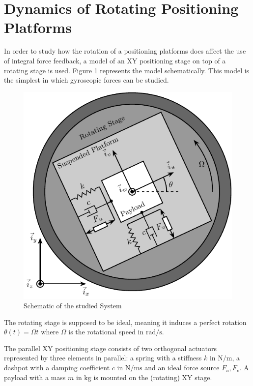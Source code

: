 \documentclass{ISMA_USD2020}
\begin{document}
\section{Dynamics of Rotating Positioning Platforms}
\label{sec:org967f3ca}
\label{sec:dynamics}
In order to study how the rotation of a positioning platforms does affect the use of integral force feedback, a model of an XY positioning stage on top of a rotating stage is used.
Figure \ref{fig:system} represents the model schematically.
This model is the simplest in which gyroscopic forces can be studied.

\begin{figure}[htbp]
\centering
\includegraphics[scale=1]{figs/system.pdf}
\caption{\label{fig:system}Schematic of the studied System}
\end{figure}

The rotating stage is supposed to be ideal, meaning it induces a perfect rotation \(\theta(t) = \Omega t\) where \(\Omega\) is the rotational speed in \(\si{\radian\per\second}\).

The parallel XY positioning stage consists of two orthogonal actuators represented by three elements in parallel: a spring with a stiffness \(k\) in \(\si{\newton\per\meter}\), a dashpot with a damping coefficient \(c\) in \(\si{\newton\per\meter\second}\) and an ideal force source \(F_u, F_v\).
A payload with a mass \(m\) in \(\si{\kilo\gram}\) is mounted on the (rotating) XY stage.
\end{document}
